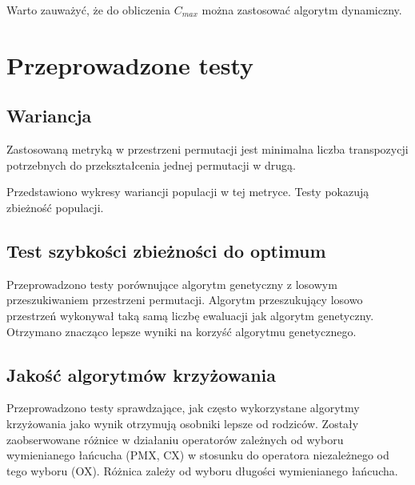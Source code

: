 \documentclass[12pt]{article}
\begin{document}
Warto zauważyć, że do obliczenia $C_{max}$ można zastosować algorytm dynamiczny. 

\section{Przeprowadzone testy}
\subsection{Wariancja}

Zastosowaną metryką w przestrzeni permutacji jest minimalna liczba
transpozycji potrzebnych do przekształcenia jednej permutacji w drugą.

Przedstawiono wykresy wariancji populacji w tej metryce. Testy
pokazują zbieżność populacji.

\subsection{Test szybkości zbieżności do optimum}

Przeprowadzono testy porównujące algorytm genetyczny z losowym
przeszukiwaniem przestrzeni permutacji. Algorytm przeszukujący losowo
przestrzeń wykonywał taką samą liczbę ewaluacji jak algorytm
genetyczny. Otrzymano znacząco lepsze wyniki na korzyść algorytmu genetycznego.

\subsection{Jakość algorytmów krzyżowania}

Przeprowadzono testy sprawdzające, jak często wykorzystane algorytmy
krzyżowania jako wynik otrzymują osobniki lepsze od rodziców. Zostały
zaobserwowane różnice w działaniu operatorów zależnych od wyboru
wymienianego łańcucha (PMX, CX) w stosunku do operatora niezależnego
od tego wyboru (OX). Różnica zależy od wyboru długości wymienianego łańcucha.
\end{document}

